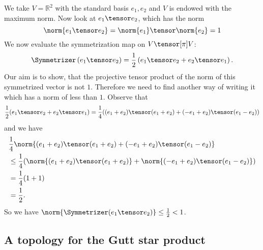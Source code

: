 \begin{example}
	We take $V = \mathbb{R}^2$ with the standard basis $e_1,	e_2$ 
	and $V$ is endowed with the maximum norm. Now look at 
	$e_1 \tensor e_2$, which has the norm
	\begin{equation*}
		\norm{
			e_1 \tensor e_2
		}
		= 
		\norm{e_1}
		\tensor
		\norm{e_2}
		=
		1
	\end{equation*}
	We now evaluate the symmetrization map on $V \tensor[\pi] V$:
	\begin{equation*}
		\Symmetrizer \left(
			e_1 \tensor e_2
		\right)
		=
		\frac{1}{2}
		\left(
			e_1 \tensor e_2
			+
			e_2 \tensor e_1
		\right).
	\end{equation*}
	Our aim is to show, that the projective tensor product of the norm of this 
	symmetrized vector is not $1$. Therefore we need to find another way of 
	writing it which has a norm of less than $1$. Observe that
	\begin{equation*}
		\frac{1}{2}
		(e_1 \tensor e_2 + e_2 \tensor e_1)
		=
		\frac{1}{4}
		(
			(e_1 + e_2) \tensor (e_1 + e_2)
			+
			(-e_1 + e_2) \tensor (e_1 - e_2)
		)
	\end{equation*}
	and we have
	\begin{align*}
		& 
		\frac{1}{4}
		\norm{
			(e_1 + e_2) \tensor (e_1 + e_2)
			+
			(-e_1 + e_2) \tensor (e_1 - e_2)
		}
		\\
		& \leq
		\frac{1}{4}
		(
			\norm{ (e_1 + e_2) \tensor (e_1 + e_2) }
			+
			\norm{ (-e_1 + e_2) \tensor (e_1 - e_2) }
		)
		\\
		& =
		\frac{1}{4}
		(1 + 1)
		\\
		& =
		\frac{1}{2}.
	\end{align*}
	So we have $\norm{\Symmetrizer(e_1 \tensor e_2)} \leq \frac{1}{2} < 1$.
\end{example}


\subsection{A topology for the Gutt star product}

